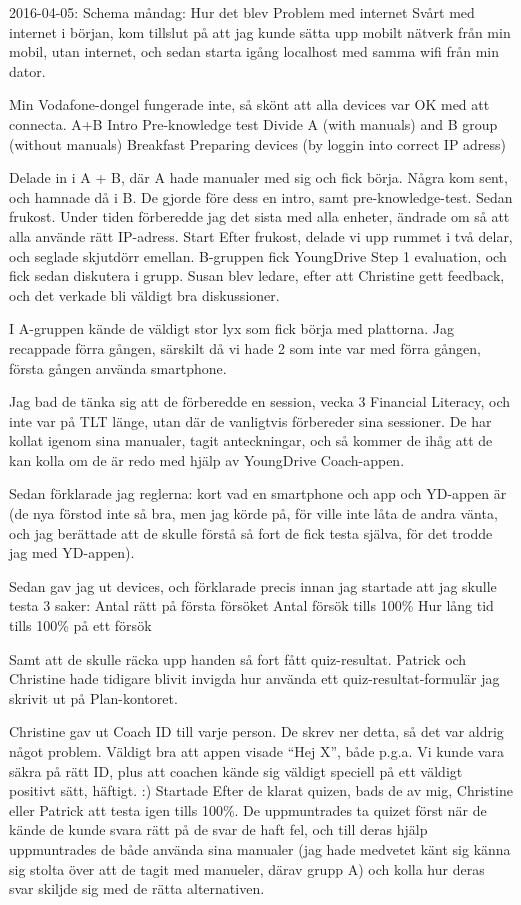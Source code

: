 2016-04-05: Schema måndag: Hur det blev
Problem med internet
Svårt med internet i början, kom tillslut på att jag kunde sätta upp mobilt nätverk från min mobil, utan internet, och sedan starta igång localhost med samma wifi från min dator.

Min Vodafone-dongel fungerade inte, så skönt att alla devices var OK med att connecta.
A+B
Intro
Pre-knowledge test
Divide A (with manuals) and B group (without manuals)
Breakfast
Preparing devices (by loggin into correct IP adress)

Delade in i A + B, där A hade manualer med sig och fick börja. Några kom sent, och hamnade då i B. De gjorde före dess en intro, samt pre-knowledge-test. Sedan frukost. Under tiden förberedde jag det sista med alla enheter, ändrade om så att alla använde rätt IP-adress.
Start
Efter frukost, delade vi upp rummet i två delar, och seglade skjutdörr emellan. B-gruppen fick YoungDrive Step 1 evaluation, och fick sedan diskutera i grupp. Susan blev ledare, efter att Christine gett feedback, och det verkade bli väldigt bra diskussioner.

I A-gruppen kände de väldigt stor lyx som fick börja med plattorna. Jag recappade förra gången, särskilt då vi hade 2 som inte var med förra gången, första gången använda smartphone.

Jag bad de tänka sig att de förberedde en session, vecka 3 Financial Literacy, och inte var på TLT länge, utan där de vanligtvis förbereder sina sessioner. De har kollat igenom sina manualer, tagit anteckningar, och så kommer de ihåg att de kan kolla om de är redo med hjälp av YoungDrive Coach-appen.

Sedan förklarade jag reglerna: kort vad en smartphone och app och YD-appen är (de nya förstod inte så bra, men jag körde på, för ville inte låta de andra vänta, och jag berättade att de skulle förstå så fort de fick testa själva, för det trodde jag med YD-appen).

Sedan gav jag ut devices, och förklarade precis innan jag startade att jag skulle testa 3 saker:
Antal rätt på första försöket
Antal försök tills 100\%
Hur lång tid tills 100\% på ett försök

Samt att de skulle räcka upp handen så fort fått quiz-resultat. Patrick och Christine hade tidigare blivit invigda hur använda ett quiz-resultat-formulär jag skrivit ut på Plan-kontoret.

Christine gav ut Coach ID till varje person. De skrev ner detta, så det var aldrig något problem. Väldigt bra att appen visade “Hej X”, både p.g.a. Vi kunde vara säkra på rätt ID, plus att coachen kände sig väldigt speciell på ett väldigt positivt sätt, häftigt. :)
Startade
Efter de klarat quizen, bads de av mig, Christine eller Patrick att testa igen tills 100\%. De uppmuntrades ta quizet först när de kände de kunde svara rätt på de svar de haft fel, och till deras hjälp uppmuntrades de både använda sina manualer (jag hade medvetet känt sig känna sig stolta över att de tagit med manueler, därav grupp A) och kolla hur deras svar skiljde sig med de rätta alternativen.

